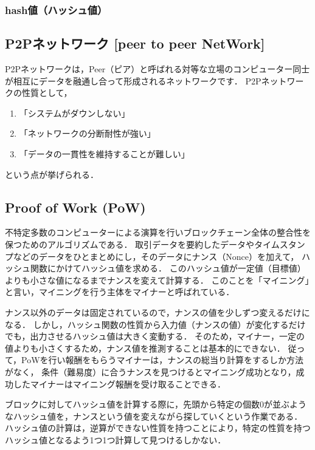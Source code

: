 \documentclass[a4paper,12pt]{jsarticle}
\begin{document}
            \subsubsection{hash値（ハッシュ値）}


\subsection{P2Pネットワーク [peer to peer NetWork]}%
P2Pネットワークは，Peer（ピア）と呼ばれる対等な立場のコンピューター同士が相互にデータを融通し合って形成されるネットワークです．
P2Pネットワークの性質として，
\begin{enumerate}
  \item 「システムがダウンしない」
  
  \item 「ネットワークの分断耐性が強い」
  
  \item 「データの一貫性を維持することが難しい」
  \end{enumerate}
という点が挙げられる．

\subsection{Proof of Work (PoW)}%
不特定多数のコンピューターによる演算を行いブロックチェーン全体の整合性を保つためのアルゴリズムである．
取引データを要約したデータやタイムスタンプなどのデータをひとまとめにし，そのデータにナンス（Nonce）を加えて，
ハッシュ関数にかけてハッシュ値を求める．
このハッシュ値が一定値（目標値）よりも小さな値になるまでナンスを変えて計算する．
このことを「マイニング」と言い，マイニングを行う主体をマイナーと呼ばれている．


ナンス以外のデータは固定されているので，ナンスの値を少しずつ変えるだけになる．
しかし，ハッシュ関数の性質から入力値（ナンスの値）が変化するだけでも，出力させるハッシュ値は大きく変動する．
そのため，マイナー，一定の値よりも小さくするため，ナンス値を推測することは基本的にできない．
従って，PoWを行い報酬をもらうマイナーは，ナンスの総当り計算をするしか方法がなく，
条件（難易度）に合うナンスを見つけるとマイニング成功となり，成功したマイナーはマイニング報酬を受け取ることできる．

ブロックに対してハッシュ値を計算する際に，先頭から特定の個数$0$が並ぶようなハッシュ値を，ナンスという値を変えながら探していくという作業である．
ハッシュ値の計算は，逆算ができない性質を持つことにより，特定の性質を持つハッシュ値となるよう1つ1つ計算して見つけるしかない．
\end{document}
